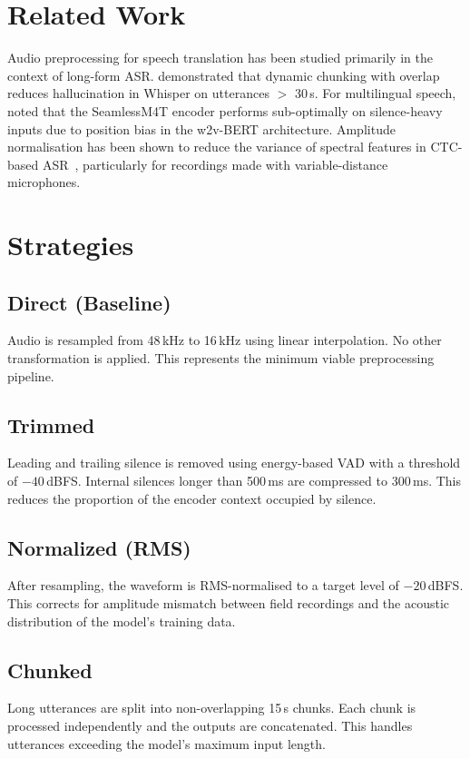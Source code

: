 \documentclass[a4paper]{article}
\begin{document}
\section{Related Work}
\label{sec:related}

Audio preprocessing for speech translation has been studied primarily in the context of long-form ASR. \citet{whisper_longform} demonstrated that dynamic chunking with overlap reduces hallucination in Whisper on utterances $>$ 30\,s. For multilingual speech, \citet{seamless2023} noted that the SeamlessM4T encoder performs sub-optimally on silence-heavy inputs due to position bias in the w2v-BERT architecture. Amplitude normalisation has been shown to reduce the variance of spectral features in CTC-based ASR~\citep{watanabe2018espnet}, particularly for recordings made with variable-distance microphones.

\section{Strategies}
\label{sec:strategies}

\subsection{Direct (Baseline)}
Audio is resampled from 48\,kHz to 16\,kHz using linear interpolation. No other transformation is applied. This represents the minimum viable preprocessing pipeline.

\subsection{Trimmed}
Leading and trailing silence is removed using energy-based VAD with a threshold of $-40$\,dBFS. Internal silences longer than 500\,ms are compressed to 300\,ms. This reduces the proportion of the encoder context occupied by silence.

\subsection{Normalized (RMS)}
After resampling, the waveform is RMS-normalised to a target level of $-20$\,dBFS. This corrects for amplitude mismatch between field recordings and the acoustic distribution of the model's training data.

\subsection{Chunked}
Long utterances are split into non-overlapping 15\,s chunks. Each chunk is processed independently and the outputs are concatenated. This handles utterances exceeding the model's maximum input length.
\end{document}
